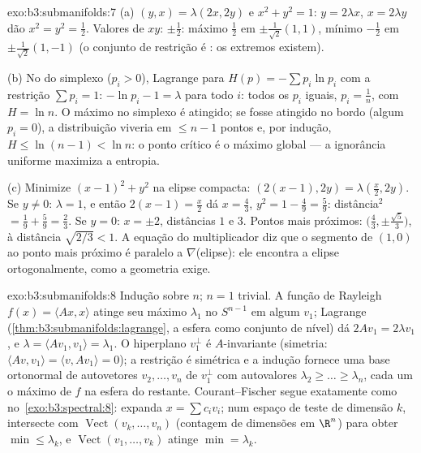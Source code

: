 \begin{solution}{exo:b3:submanifolds:7}
(a) $(y, x) = \lambda(2x, 2y)$ e $x^2 + y^2 = 1$: $y =
2\lambda x$, $x = 2\lambda y$ dão $x^2 = y^2 = \frac12$.
Valores de $xy$: $\pm\frac12$: máximo $\frac12$ em
$\pm\frac1{\sqrt2}(1,1)$, mínimo $-\frac12$ em
$\pm\frac1{\sqrt2}(1,-1)$ (o conjunto de restrição é :
os extremos existem).

(b) No  do simplexo ($p_i > 0$), Lagrange para
$H(p) = -\sum p_i\ln p_i$ com a restrição $\sum p_i = 1$:
$-\ln p_i - 1 = \lambda$ para todo $i$: todos os $p_i$ iguais, $p_i =
\frac1n$, com $H = \ln n$. O máximo no simplexo
 é atingido; se fosse atingido no bordo
(algum $p_i = 0$), a distribuição viveria em $\leq n - 1$
pontos e, por indução, $H \leq \ln(n-1) < \ln n$: o
ponto crítico  é o máximo global --- a
ignorância uniforme maximiza a entropia.

(c) Minimize $(x-1)^2 + y^2$ na elipse compacta:
$(2(x{-}1), 2y) = \lambda(\frac x2, 2y)$. Se $y \neq 0$:
$\lambda = 1$, e então $2(x - 1) = \frac x2$ dá $x =
\frac43$, $y^2 = 1 - \frac49 = \frac59$: distância$^2$ $=
\frac19 + \frac59 = \frac23$. Se $y = 0$: $x = \pm2$,
distâncias $1$ e $3$. Pontos mais próximos: $\bigl(\frac43,
\pm\frac{\sqrt5}3\bigr)$, à distância $\sqrt{2/3} < 1$. A
equação do multiplicador diz que o segmento de $(1,0)$ ao
ponto mais próximo é paralelo a $\nabla$(elipse): ele encontra a
elipse ortogonalmente, como a geometria exige.
\end{solution}

\begin{solution}{exo:b3:submanifolds:8}
Indução sobre $n$; $n = 1$ trivial. A função de Rayleigh
$f(x) = \langle Ax, x\rangle$ atinge seu máximo $\lambda_1$
no  $S^{n-1}$ em algum $v_1$; Lagrange
(\cref{thm:b3:submanifolds:lagrange}, a esfera como conjunto de nível)
dá $2Av_1 = 2\lambda v_1$, e $\lambda = \langle Av_1,
v_1\rangle = \lambda_1$. O hiperplano $v_1^\perp$ é
$A$-invariante (simetria: $\langle Av, v_1\rangle = \langle
v, Av_1\rangle = 0$); a restrição é simétrica e a
indução fornece uma base ortonormal de autovetores $v_2, \dots, v_n$
de $v_1^\perp$ com autovalores $\lambda_2 \geq \dots \geq
\lambda_n$, cada um o máximo de $f$ na esfera do
 restante. Courant--Fischer segue exatamente
como no~\cref{exo:b3:spectral:8}: expanda $x = \sum c_iv_i$;
num espaço de teste de dimensão $k$, intersecte com
$\operatorname{Vect}(v_k, \dots, v_n)$ (contagem de dimensões em
$\R^n$) para obter $\min \leq \lambda_k$, e
$\operatorname{Vect}(v_1, \dots, v_k)$ atinge $\min =
\lambda_k$.
\end{solution}

